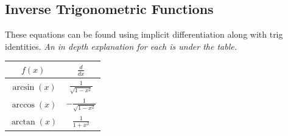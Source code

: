 \documentclass[12pt]{article}
\begin{document}
\subsection{Inverse Trigonometric Functions}
These equations can be found using implicit differentiation along with trig identities. \textit{An in depth explanation for each is under the table.}
\begin{center}
    \begin{tabular}{|c|c|}
        \hline
        $f(x)$       & $\frac{d}{dx}$            \\
        \hline \hline
        $\arcsin(x)$ & $\frac{1}{\sqrt{1-x^2}}$  \\
        \hline
        $\arccos(x)$ & $-\frac{1}{\sqrt{1-x^2}}$ \\
        \hline
        $\arctan(x)$ & $\frac{1}{1+x^2}$         \\
        \hline
    \end{tabular}
\end{center}
\end{document}
